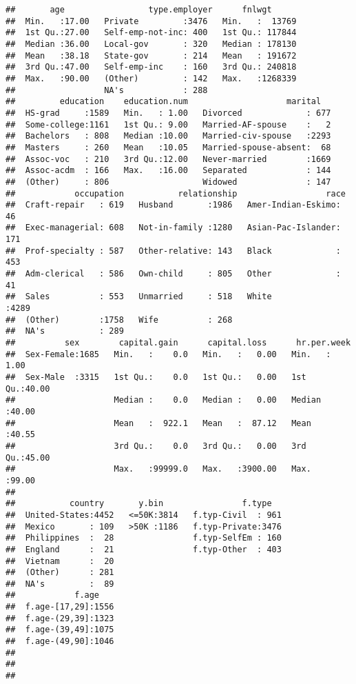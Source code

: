 \documentclass[12pt,]{article}
\begin{document}
\begin{verbatim}
##       age                 type.employer      fnlwgt       
##  Min.   :17.00   Private         :3476   Min.   :  13769  
##  1st Qu.:27.00   Self-emp-not-inc: 400   1st Qu.: 117844  
##  Median :36.00   Local-gov       : 320   Median : 178130  
##  Mean   :38.18   State-gov       : 214   Mean   : 191672  
##  3rd Qu.:47.00   Self-emp-inc    : 160   3rd Qu.: 240818  
##  Max.   :90.00   (Other)         : 142   Max.   :1268339  
##                  NA's            : 288                    
##         education    education.num                    marital    
##  HS-grad     :1589   Min.   : 1.00   Divorced             : 677  
##  Some-college:1161   1st Qu.: 9.00   Married-AF-spouse    :   2  
##  Bachelors   : 808   Median :10.00   Married-civ-spouse   :2293  
##  Masters     : 260   Mean   :10.05   Married-spouse-absent:  68  
##  Assoc-voc   : 210   3rd Qu.:12.00   Never-married        :1669  
##  Assoc-acdm  : 166   Max.   :16.00   Separated            : 144  
##  (Other)     : 806                   Widowed              : 147  
##            occupation           relationship                  race     
##  Craft-repair   : 619   Husband       :1986   Amer-Indian-Eskimo:  46  
##  Exec-managerial: 608   Not-in-family :1280   Asian-Pac-Islander: 171  
##  Prof-specialty : 587   Other-relative: 143   Black             : 453  
##  Adm-clerical   : 586   Own-child     : 805   Other             :  41  
##  Sales          : 553   Unmarried     : 518   White             :4289  
##  (Other)        :1758   Wife          : 268                            
##  NA's           : 289                                                  
##          sex        capital.gain      capital.loss      hr.per.week   
##  Sex-Female:1685   Min.   :    0.0   Min.   :   0.00   Min.   : 1.00  
##  Sex-Male  :3315   1st Qu.:    0.0   1st Qu.:   0.00   1st Qu.:40.00  
##                    Median :    0.0   Median :   0.00   Median :40.00  
##                    Mean   :  922.1   Mean   :  87.12   Mean   :40.55  
##                    3rd Qu.:    0.0   3rd Qu.:   0.00   3rd Qu.:45.00  
##                    Max.   :99999.0   Max.   :3900.00   Max.   :99.00  
##                                                                       
##           country       y.bin                f.type    
##  United-States:4452   <=50K:3814   f.typ-Civil  : 961  
##  Mexico       : 109   >50K :1186   f.typ-Private:3476  
##  Philippines  :  28                f.typ-SelfEm : 160  
##  England      :  21                f.typ-Other  : 403  
##  Vietnam      :  20                                    
##  (Other)      : 281                                    
##  NA's         :  89                                    
##            f.age     
##  f.age-[17,29]:1556  
##  f.age-(29,39]:1323  
##  f.age-(39,49]:1075  
##  f.age-(49,90]:1046  
##                      
##                      
## 
\end{verbatim}
\end{document}
